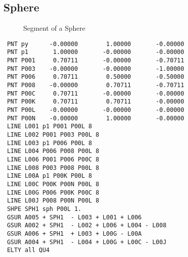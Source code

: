 \documentclass{article}
\begin{document}
\begin{appendix}
\subsection{\label{Sphere}Sphere}
\begin{figure}[h]
\caption{\label{Segment of a Sphere}Segment of a Sphere}
\end{figure}
\begin{verbatim}
 PNT py      -0.00000        1.00000       -0.00000 
 PNT p1       1.00000       -0.00000       -0.00000 
 PNT P001     0.70711       -0.00000       -0.70711 
 PNT P003    -0.00000       -0.00000       -1.00000 
 PNT P006     0.70711        0.50000       -0.50000 
 PNT P008    -0.00000        0.70711       -0.70711 
 PNT P00C     0.70711       -0.00000       -0.00000 
 PNT P00K     0.70711        0.70711       -0.00000 
 PNT P00L    -0.00000       -0.00000       -0.00000 
 PNT P00N    -0.00000        1.00000       -0.00000 
 LINE L001 p1 P001 P00L 8              
 LINE L002 P001 P003 P00L 8              
 LINE L003 p1 P006 P00L 8              
 LINE L004 P006 P008 P00L 8              
 LINE L006 P001 P006 P00C 8              
 LINE L008 P003 P008 P00L 8              
 LINE L00A p1 P00K P00L 8              
 LINE L00C P00K P00N P00L 8              
 LINE L00G P006 P00K P00C 8              
 LINE L00J P008 P00N P00L 8              
 SHPE SPH1 sph P00L 1.
 GSUR A005 + SPH1  - L003 + L001 + L006 
 GSUR A002 + SPH1  - L002 + L006 + L004 - L008 
 GSUR A006 + SPH1  + L003 + L00G - L00A 
 GSUR A004 + SPH1  - L004 + L00G + L00C - L00J 
 ELTY all QU4 
\end{verbatim}



\end{appendix}
\end{document}
